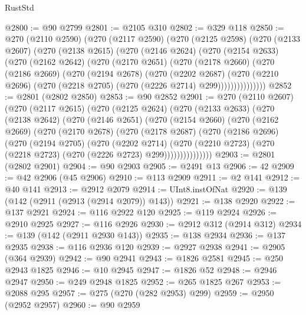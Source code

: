 \begin{lexlean}{RustStd}
\begin{coremodule}
@2800 := @90 @2799
@2801 := @2105 @310
@2802 := @329 @118
@2850 := @270
    (@2110 @2590)
    (@270
      (@2117 @2590)
      (@270
        (@2125 @2598)
        (@270
          (@2133 @2607)
          (@270
            (@2138 @2615)
            (@270
              (@2146 @2624)
              (@270
                (@2154 @2633)
                (@270
                  (@2162 @2642)
                  (@270
                    (@2170 @2651)
                    (@270
                      (@2178 @2660)
                      (@270
                        (@2186 @2669)
                        (@270
                          (@2194 @2678)
                          (@270
                            (@2202 @2687)
                            (@270
                              (@2210 @2696)
                              (@270 (@2218 @2705) (@270 (@2226 @2714) @299)))))))))))))))
@2852 := @2801 (@2802 @2850)
@2853 := @90 @2852
@2901 := @270
    (@2110 @2607)
    (@270
      (@2117 @2615)
      (@270
        (@2125 @2624)
        (@270
          (@2133 @2633)
          (@270
            (@2138 @2642)
            (@270
              (@2146 @2651)
              (@270
                (@2154 @2660)
                (@270
                  (@2162 @2669)
                  (@270
                    (@2170 @2678)
                    (@270
                      (@2178 @2687)
                      (@270
                        (@2186 @2696)
                        (@270
                          (@2194 @2705)
                          (@270
                            (@2202 @2714)
                            (@270
                              (@2210 @2723)
                              (@270 (@2218 @2723) (@270 (@2226 @2723) @299)))))))))))))))
@2903 := @2801 (@2802 @2901)
@2904 := @90 @2903
@2905 := @2491 @13
@2906 := 42
@2909 := @42 @2906 (@45 @2906)
@2910 := @113 @2909
@2911 := @2 @141
@2912 := @40 @141
@2913 := @2912 @2079
@2914 := UInt8.instOfNat
@2920 := @139 (@142 (@2911 (@2913 (@2914 @2079)) @143))
@2921 := @138 @2920
@2922 := @137 @2921
@2924 := @116 @2922 @120
@2925 := @119 @2924
@2926 := @2910 @2925
@2927 := @116 @2926
@2930 := @2912 @312 (@2914 @312)
@2934 := @139 (@142 (@2911 @2930 @143))
@2935 := @138 @2934
@2936 := @137 @2935
@2938 := @116 @2936 @120
@2939 := @2927 @2938
@2941 := @2905 (@364 @2939)
@2942 := @90 @2941
@2943 := @1826 @2581
@2945 := @250 @2943 @1825
@2946 := @10 @2945
@2947 := @1826 @52
@2948 := @2946 @2947
@2950 := @249 @2948 @1825
@2952 := @265 @1825 @267
@2953 := @2088 @295
@2957 := @275 (@270 (@282 @2953) @299)
@2959 := @2950 (@2952 @2957)
@2960 := @90 @2959

\end{coremodule}
\end{lexlean}

